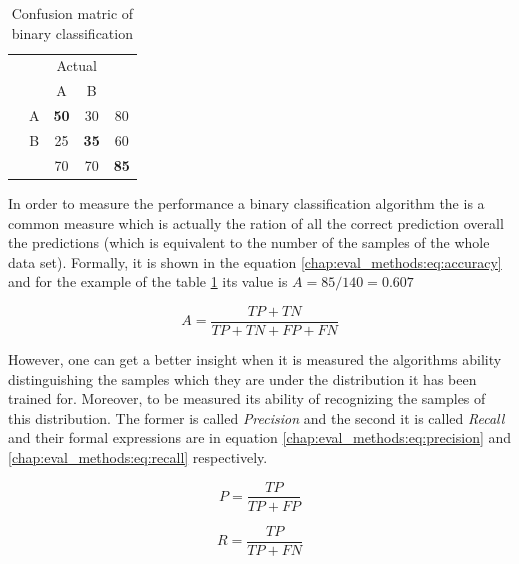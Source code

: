 \begin{table}[H]
	\center
	\caption{Confusion matric of binary classification}\label{chap:eval_methods:tbl:bin_confusion}
	\begin{tabular}{c c c c c}
		& & \multicolumn{2}{c}{Actual} & \\
		\cline{3-4}
		\multirow{3}{*}{\rotatebox[origin=r]{90}{Predicted}} & & \multicolumn{1}{|c}{A} & \multicolumn{1}{c|}{B} & \\
		\cline{2-4}
		& \multicolumn{1}{|c}{A} & \multicolumn{1}{|c}{\textbf{50}} & \multicolumn{1}{c|}{30} & 80 \\
		& \multicolumn{1}{|c}{B} & \multicolumn{1}{|c}{25} & \multicolumn{1}{c|}{\textbf{35}} & 60 \\
		\cline{2-4}
		&  & 70 & 70 & \textbf{85}\\
	\end{tabular}
\end{table}

In order to measure the performance a binary classification algorithm the  is a common measure which is actually the ration of all the correct prediction overall the predictions (which is equivalent to the number of the samples of the whole data set). Formally, it is shown in the equation \ref{chap:eval_methods:eq:accuracy} and for the example of the table \ref{chap:eval_methods:tbl:bin_confusion} its value is $A = 85/140 = 0.607$

\begin{equation}\label{chap:eval_methods:eq:accuracy}
A = \frac {TP + TN} {TP +  TN + FP + FN}
\end{equation}

However, one can get a better insight when it is measured the algorithms ability distinguishing the samples which they are under the distribution it has been trained for. Moreover, to be measured its ability of recognizing the samples of this distribution. The former is called \textit{Precision} and the second it is called \textit{Recall} and their formal expressions are in equation \ref{chap:eval_methods:eq:precision} and \ref{chap:eval_methods:eq:recall} respectively. 

\begin{equation}\label{chap:eval_methods:eq:precision}
	P = \frac {TP} {TP + FP}
\end{equation}

\begin{equation}\label{chap:eval_methods:eq:recall}
	R = \frac {TP} {TP + FN}
\end{equation}

